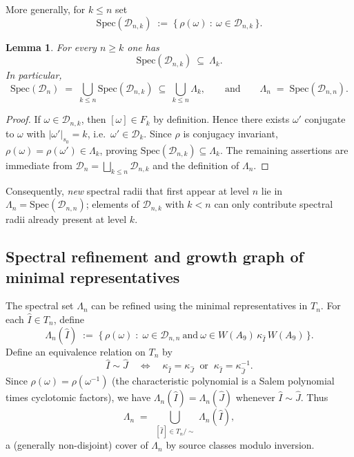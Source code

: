 \documentclass[11pt]{amsart}
\numberwithin{equation}{section}
\newtheorem{lem}[thm]{Lemma}
\begin{document}
More generally, for $k\le n$ set
\[
\mathrm{Spec}(\mathcal{D}_{n,k}) \;:=\; \{\, \rho(\omega)\ :\ \omega\in \mathcal{D}_{n,k}\,\}.
\]

\begin{lem}\label{L:spec-projection}
For every $n\ge k$ one has
\[
\mathrm{Spec}(\mathcal{D}_{n,k}) \ \subseteq\ \Lambda_k.
\]
In particular,
\[
\mathrm{Spec}(\mathcal{D}_n)
\;=\;
\bigcup_{k\le n}\mathrm{Spec}(\mathcal{D}_{n,k})
\ \subseteq\
\bigcup_{k\le n}\Lambda_k,
\qquad\text{and}\qquad
\Lambda_n \;=\; \mathrm{Spec}(\mathcal{D}_{n,n}).
\]
\end{lem}

\begin{proof}
If $\omega\in\mathcal{D}_{n,k}$, then $[\omega]\in F_k$ by definition.
Hence there exists $\omega'$ conjugate to $\omega$ with $|\omega'|_{s_0}=k$,
i.e.\ $\omega'\in\mathcal{D}_k$.
Since $\rho$ is conjugacy invariant, $\rho(\omega)=\rho(\omega')\in\Lambda_k$,
proving $\mathrm{Spec}(\mathcal{D}_{n,k})\subseteq \Lambda_k$.
The remaining assertions are immediate from
$\mathcal{D}_n=\bigsqcup_{k\le n}\mathcal{D}_{n,k}$ and the definition of $\Lambda_n$.
\end{proof}

\noindent
Consequently, \emph{new} spectral radii that first appear at level $n$ lie in
$\Lambda_n=\mathrm{Spec}(\mathcal{D}_{n,n})$; elements of $\mathcal{D}_{n,k}$ with $k<n$
can only contribute spectral radii already present at level $k$.

\subsection{Spectral refinement and growth graph of minimal representatives}\label{SS:spec-growth}

\medskip
The spectral set $\Lambda_n$ can be refined using the minimal
representatives in $T_n$.
For each $\widehat I\in T_n$, define
\[
\Lambda_n(\widehat I)
\;:=\;
\bigl\{\,
\rho(\omega)
\;:\;
\omega \in \mathcal{D}_{n,n}
\ \text{and}\
\omega \in W(A_9)\,\kappa_{\widehat I}\,W(A_9)
\,\bigr\}.
\]
Define an equivalence relation on $T_n$ by
\[
\widehat I \sim \widehat J
\quad\Longleftrightarrow\quad
\kappa_{\widehat I}=\kappa_{\widehat J}
\ \text{ or }\
\kappa_{\widehat I}=\kappa_{\widehat J}^{-1}.
\]
Since $\rho(\omega)=\rho(\omega^{-1})$ (the characteristic polynomial
is a Salem polynomial times cyclotomic factors), we have
$\Lambda_n(\widehat I)=\Lambda_n(\widehat J)$ whenever
$\widehat I\sim \widehat J$.
Thus
\[
\Lambda_n
\;=\;
\bigcup_{\,[\widehat I]\in T_n/\!\sim}\,
\Lambda_n(\widehat I),
\]
a (generally non-disjoint) cover of $\Lambda_n$ by source classes
modulo inversion.
\end{document}
